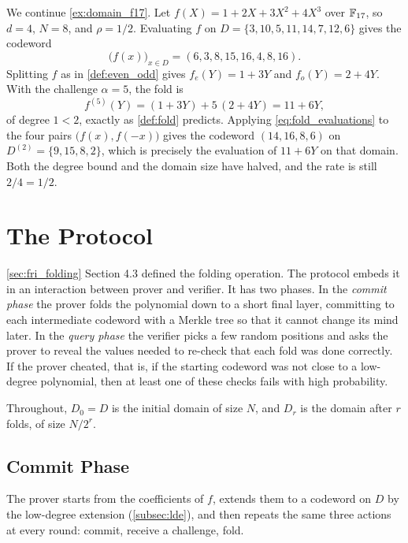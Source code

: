 \begin{example}
\label{ex:fold_f17}
We continue \cref{ex:domain_f17}. Let
$f(X) = 1 + 2X + 3X^2 + 4X^3$ over $\mathbb{F}_{17}$, so $d = 4$, $N = 8$, and
$\rho = 1/2$. Evaluating $f$ on $D = \{3, 10, 5, 11, 14, 7, 12, 6\}$
gives the codeword
%
\[
\bigl(f(x)\bigr)_{x \in D} = (6, 3, 8, 15, 16, 4, 8, 16).
\]
%
Splitting $f$ as in \cref{def:even_odd} gives $f_e(Y) = 1 + 3Y$ and
$f_o(Y) = 2 + 4Y$. With the challenge $\alpha = 5$, the fold is
%
\[
f^{(5)}(Y) = (1 + 3Y) + 5\,(2 + 4Y) = 11 + 6Y ,
\]
%
of degree $1 < 2$, exactly as \cref{def:fold} predicts. Applying
\cref{eq:fold_evaluations} to the four pairs $\bigl(f(x), f(-x)\bigr)$
gives the codeword $(14, 16, 8, 6)$ on $D^{(2)} = \{9, 15, 8, 2\}$, which
is precisely the evaluation of $11 + 6Y$ on that domain. Both the degree
bound and the domain size have halved, and the rate is still
$2/4 = 1/2$.
\end{example}

\section{The Protocol}
\label{sec:fri_protocol}

\cref{sec:fri_folding} Section 4.3 defined the folding operation. 
The protocol embeds it in an interaction between prover and verifier.
It has two phases. In the \emph{commit phase} the prover folds
the polynomial down to a short final layer, committing to each
intermediate codeword with a Merkle tree so that it cannot change its
mind later. In the \emph{query phase} the verifier picks a few random
positions and asks the prover to reveal the values needed to re-check
that each fold was done correctly. If the prover cheated, that is, if the
starting codeword was not close to a low-degree polynomial, then at least
one of these checks fails with high probability.

Throughout, $D_0 = D$ is the initial domain of size $N$, and
$D_{r}$ is the domain after $r$ folds, of size $N/2^r$.


\subsection{Commit Phase}
\label{subsec:commit_phase}

The prover starts from the coefficients of $f$, extends them to a
codeword on $D$ by the low-degree extension (\cref{subsec:lde}), and then
repeats the same three actions at every round: commit, receive a
challenge, fold.

